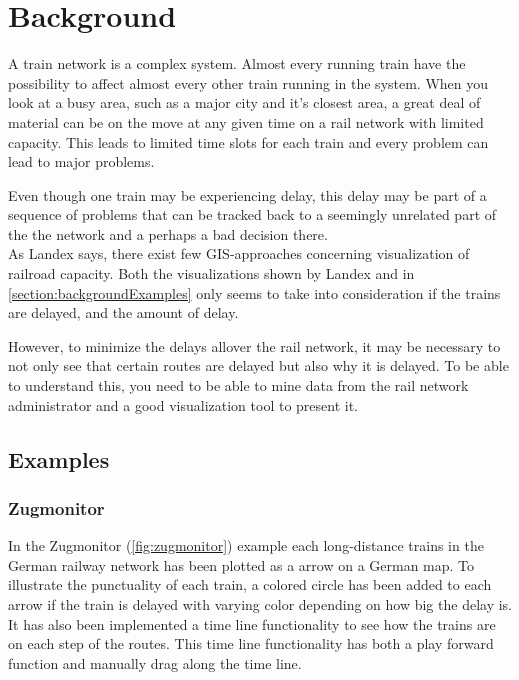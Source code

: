 
\chapter{Background}
\label{chapter:background}

A train network is a complex system. Almost every running train have the 
possibility to affect almost every other train running in the system.  When you look at a busy area, such as a major city and it's closest
area, a great deal of material can be on the move at any given time on a
rail network with limited capacity. This leads to limited time slots for each 
train and every problem can lead to major problems.

Even though one train may be experiencing delay, this delay may be part of a
sequence of problems that can be tracked back to a seemingly unrelated part of
the the network and a perhaps a bad decision there\cite{cule2011mining}. \\

As Landex\cite{landex2009gis} says, there exist few GIS-approaches concerning
visualization of railroad capacity. Both the visualizations shown by Landex and
in \vref{section:backgroundExamples} only seems to take into consideration if
the trains are delayed, and the amount of delay. 

However, to minimize the delays allover the rail network, it may be necessary
to not only see that certain routes are delayed but also why it is delayed. To
be able to understand this, you need to be able to mine data from the rail
network administrator and a good visualization tool to present it. 

\pagebreak
\section{Examples}
\label{section:backgroundExamples}

\subsection{Zugmonitor}
\label{subsection:zugmonitor}

In the Zugmonitor (\vref{fig:zugmonitor}) example each long-distance trains in
the German railway network has been plotted as a arrow on a German map. To
illustrate the punctuality of each train, a colored circle has been added to
each arrow if the train is delayed with varying color depending on how big the
delay is. It has also been implemented a time line functionality to see how the
trains are on each step of the routes. This time line functionality has both a
play forward function and manually drag along the time line.

